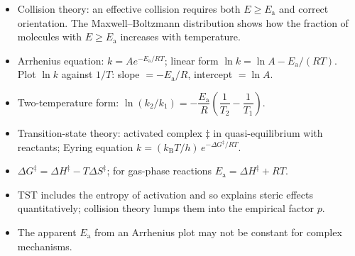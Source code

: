 \documentclass[11pt]{article}
\begin{document}
\begin{aretenir}
\begin{itemize}
  \item Collision theory: an effective collision requires both $E \ge E_{\mathrm{a}}$ and correct orientation. The Maxwell--Boltzmann distribution shows how the fraction of molecules with $E \ge E_{\mathrm{a}}$ increases with temperature.
  \item Arrhenius equation: $k = A e^{-E_{\mathrm{a}}/RT}$; linear form $\ln k = \ln A - E_{\mathrm{a}}/(RT)$. Plot $\ln k$ against $1/T$: slope $= -E_{\mathrm{a}}/R$, intercept $= \ln A$.
  \item Two-temperature form: $\ln(k_2/k_1) = -\dfrac{E_{\mathrm{a}}}{R}\left(\dfrac{1}{T_2}-\dfrac{1}{T_1}\right)$.
  \item Transition-state theory: activated complex $\ddagger$ in quasi-equilibrium with reactants; Eyring equation $k = (k_{\mathrm{B}}T/h)\, e^{-\Delta G^{\ddagger}/RT}$.
  \item $\Delta G^{\ddagger} = \Delta H^{\ddagger} - T\Delta S^{\ddagger}$; for gas-phase reactions $E_{\mathrm{a}} = \Delta H^{\ddagger} + RT$.
  \item TST includes the entropy of activation and so explains steric effects quantitatively; collision theory lumps them into the empirical factor $p$.
  \item The apparent $E_{\mathrm{a}}$ from an Arrhenius plot may not be constant for complex mechanisms.
\end{itemize}
\end{aretenir}
\end{document}

